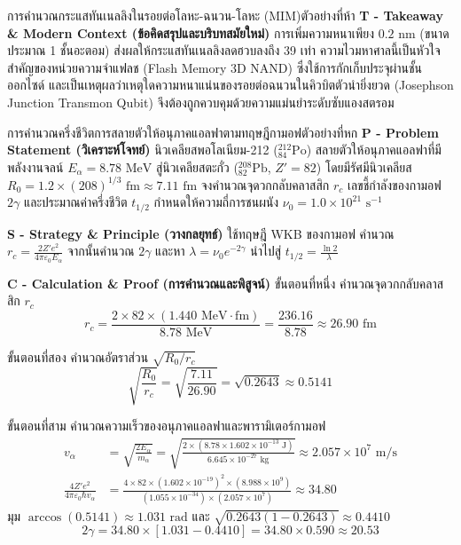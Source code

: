 \begin{psctbox}{การคำนวณกระแสทันเนลลิงในรอยต่อโลหะ-ฉนวน-โลหะ (MIM)}{ตัวอย่างที่ห้า}
\vspace{6pt}
\noindent\textbf{T - Takeaway \& Modern Context (ข้อคิดสรุปและบริบทสมัยใหม่)} การเพิ่มความหนาเพียง $0.2\text{ nm}$ (ขนาดประมาณ 1 ชั้นอะตอม) ส่งผลให้กระแสทันเนลลิงลดฮวบลงถึง 39 เท่า ความไวมหาศาลนี้เป็นหัวใจสำคัญของหน่วยความจำแฟลช (Flash Memory 3D NAND) ซึ่งใช้การกักเก็บประจุผ่านชั้นออกไซด์ และเป็นเหตุผลว่าเหตุใดความหนาแน่นของรอยต่อฉนวนในคิวบิตตัวนำยิ่งยวด (Josephson Junction Transmon Qubit) จึงต้องถูกควบคุมด้วยความแม่นยำระดับซับแองสตรอม
\end{psctbox}

\begin{psctbox}{การคำนวณครึ่งชีวิตการสลายตัวให้อนุภาคแอลฟาตามทฤษฎีกามอฟ}{ตัวอย่างที่หก}
\noindent\textbf{P - Problem Statement (วิเคราะห์โจทย์)} นิวเคลียสพอโลเนียม-212 ($^{212}_{84}\text{Po}$) สลายตัวให้อนุภาคแอลฟาที่มีพลังงานจลน์ $E_\alpha = 8.78\text{ MeV}$ สู่นิวเคลียสตะกั่ว ($^{208}_{82}\text{Pb}$, $Z' = 82$) โดยมีรัศมีนิวเคลียส $R_0 = 1.2 \times (208)^{1/3}\text{ fm} \approx 7.11\text{ fm}$ จงคำนวณจุดวกกลับคลาสสิก $r_c$ เลขชี้กำลังของกามอฟ $2\gamma$ และประมาณค่าครึ่งชีวิต $t_{1/2}$ กำหนดให้ความถี่การชนผนัง $\nu_0 = 1.0 \times 10^{21}\text{ s}^{-1}$

\vspace{6pt}
\noindent\textbf{S - Strategy \& Principle (วางกลยุทธ์)} ใช้ทฤษฎี WKB ของกามอฟ คำนวณ $r_c = \frac{2Z'e^2}{4\pi\varepsilon_0 E_\alpha}$ จากนั้นคำนวณ $2\gamma$ และหา $\lambda = \nu_0 e^{-2\gamma}$ นำไปสู่ $t_{1/2} = \frac{\ln 2}{\lambda}$

\vspace{6pt}
\noindent\textbf{C - Calculation \& Proof (การคำนวณและพิสูจน์)}
ขั้นตอนที่หนึ่ง คำนวณจุดวกกลับคลาสสิก $r_c$
\begin{equation}
r_c = \frac{2 \times 82 \times (1.440\text{ MeV}\cdot\text{fm})}{8.78\text{ MeV}} = \frac{236.16}{8.78} \approx 26.90\text{ fm}
\end{equation}

ขั้นตอนที่สอง คำนวณอัตราส่วน $\sqrt{R_0 / r_c}$
\begin{equation}
\sqrt{\frac{R_0}{r_c}} = \sqrt{\frac{7.11}{26.90}} = \sqrt{0.2643} \approx 0.5141
\end{equation}

ขั้นตอนที่สาม คำนวณความเร็วของอนุภาคแอลฟาและพารามิเตอร์กามอฟ
\begin{align}
v_\alpha &= \sqrt{\frac{2 E_\alpha}{m_\alpha}} = \sqrt{\frac{2 \times (8.78 \times 1.602 \times 10^{-13}\text{ J})}{6.645 \times 10^{-27}\text{ kg}}} \approx 2.057 \times 10^7\text{ m/s} \\
\frac{4 Z' e^2}{4\pi\varepsilon_0 \hbar v_\alpha} &= \frac{4 \times 82 \times (1.602 \times 10^{-19})^2 \times (8.988 \times 10^9)}{(1.055 \times 10^{-34}) \times (2.057 \times 10^7)} \approx 34.80
\end{align}
มุม $\arccos(0.5141) \approx 1.031\text{ rad}$ และ $\sqrt{0.2643(1 - 0.2643)} \approx 0.4410$
\begin{equation}
2\gamma = 34.80 \times [1.031 - 0.4410] = 34.80 \times 0.590 \approx 20.53
\end{equation}


\end{psctbox}
